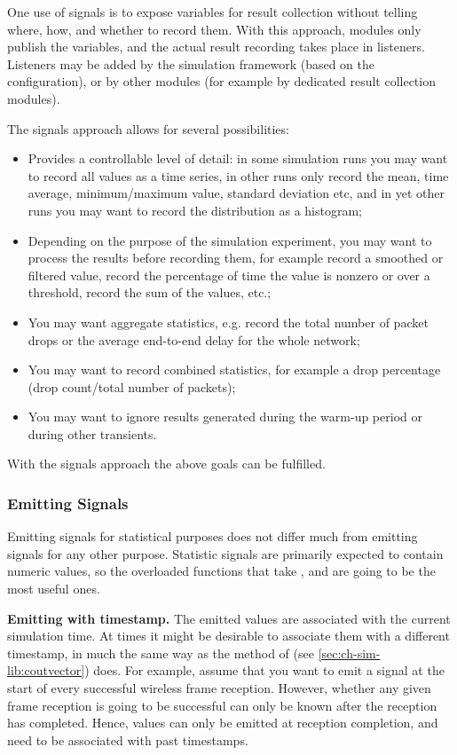 One use of signals is to expose variables for result collection without
telling where, how, and whether to record them. With this approach,
modules only publish the variables, and the actual result recording
takes place in listeners. Listeners may be added by the simulation
framework (based on the configuration), or by other modules (for example
by dedicated result collection modules).

The signals approach allows for several possibilities:

\begin{itemize}
 \item Provides a controllable level of detail: in some simulation runs
    you may want to record all values as a time series, in other runs
    only record the mean, time average, minimum/maximum value, standard
    deviation etc, and in yet other runs you may want to record the
    distribution as a histogram;
 \item Depending on the purpose of the simulation experiment, you may want
    to process the results before recording them, for example
    record a smoothed or filtered value, record the percentage of time the
    value is nonzero or over a threshold, record the sum of the values, etc.;
 \item You may want aggregate statistics, e.g. record the total number
    of packet drops or the average end-to-end delay for the whole network;
 \item You may want to record combined statistics, for example a drop
    percentage (drop count/total number of packets);
 \item You may want to ignore results generated during the warm-up period
    or during other transients.
\end{itemize}

With the signals approach the above goals can be fulfilled.


\subsubsection{Emitting Signals}

Emitting signals for statistical purposes does not differ much from
emitting signals for any other purpose. Statistic signals are primarily
expected to contain numeric values, so the overloaded  functions
that take ,  and  are going to be the
most useful ones.

\textbf{Emitting with timestamp.} The emitted values are associated with
the current simulation time. At times it might be desirable to associate
them with a different timestamp, in much the same way as the
 method of  (see
\ref{sec:ch-sim-lib:coutvector}) does. For example, assume that you want to
emit a signal at the start of every successful wireless frame reception.
However, whether any given frame reception is going to be successful can
only be known after the reception has completed. Hence, values can only be
emitted at reception completion, and need to be associated with past
timestamps.

